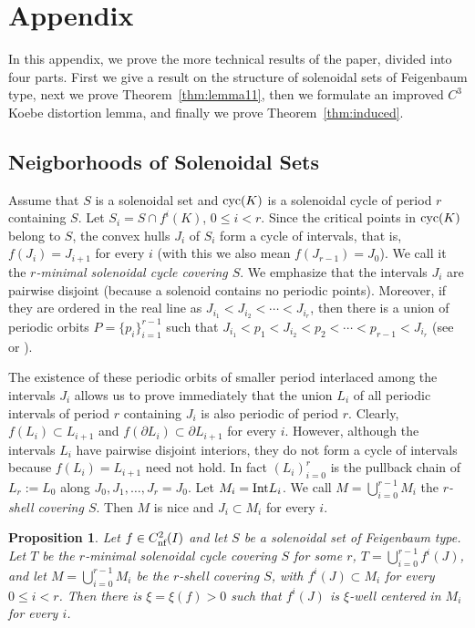 \documentclass[12pt, psamsfonts, reqno]{amsart}
\newtheorem{proposition}[theorem]{Proposition}
\begin{document}
\section{Appendix} \label{sec:appendix}

In this appendix, we prove the more technical results of the
paper, divided into four parts. First we give a result on the
structure of solenoidal sets of Feigenbaum type, next we prove
Theorem~\ref{thm:lemma11}, then we formulate an improved $C^3$
Koebe distortion lemma, and finally we prove
Theorem~\ref{thm:induced}.

\subsection{Neigborhoods of Solenoidal Sets}

Assume that $S$ is a solenoidal set and ${\mathop{\rm cyc}\nolimits}(K)$ is a solenoidal
cycle of period $r$ containing $S$. Let $S_i=S\cap f^i(K)$, $0\leq
i<r$. Since the critical points in ${\mathop{\rm cyc}\nolimits}(K)$ belong to $S$, the
convex hulls $J_i$ of $S_i$ form a cycle of intervals, that is,
$f(J_i)=J_{i+1}$ for every $i$ (with this we also mean
$f(J_{r-1})=J_0$). We call it the \emph{$r$-minimal solenoidal
cycle covering $S$}. We emphasize that the intervals $J_i$ are
pairwise disjoint (because a solenoid contains no periodic
points). Moreover, if they are ordered in the real line as
$J_{i_1}<J_{i_2}<\cdots<J_{i_r}$, then there is a union of
periodic orbits $P=\{p_i\}_{i=1}^{r-1}$ such that
$J_{i_1}<p_1<J_{i_2}<p_2<\cdots <p_{r-1}<J_{i_r}$ (see \cite{MT}
or \cite{AJS}).

The existence of these periodic orbits of smaller period
interlaced among the intervals $J_i$ allows us to prove
immediately that the union $L_i$ of all periodic intervals of
period $r$ containing $J_i$ is also periodic of period $r$.
Clearly, $f(L_i)\subset L_{i+1}$ and $f(\partial L_i)\subset
\partial L_{i+1}$ for every $i$. However, although the intervals
$L_i$ have pairwise disjoint interiors, they do not form a cycle
of intervals because $f(L_i)=L_{i+1}$ need not hold. In fact
$(L_i)_{i=0}^r$ is the pullback chain of $L_r:=L_0$ along
$J_0,J_1,\ldots,J_r=J_0$. Let $M_i={\mathop{\rm Int}\nolimits} L_i$. We call
$M=\bigcup_{i=0}^{r-1} M_i$ the \emph{$r$-shell covering $S$}.
Then $M$ is nice and  $J_i\subset M_i$ for every $i$.

\begin{proposition} \label{prop:feigenbaum}
Let $f\in {C^2_{\text{\rm nf}}}(I)$ and let $S$ be a
 solenoidal set of Feigenbaum type. Let $T$ be
 the $r$-minimal solenoidal cycle covering $S$ for some $r$,
 $T=\bigcup_{i=0}^{r-1} f^i(J)$, and let $M=\bigcup_{i=0}^{r-1} M_i$
 be the $r$-shell covering $S$, with $f^i(J)\subset M_i$ for
 every $0\leq i <r$. Then there is $\xi=\xi(f)>0$
 such that $f^i(J)$ is $\xi$-well centered
 in $M_i$ for every $i$.
\end{proposition}
\end{document}
